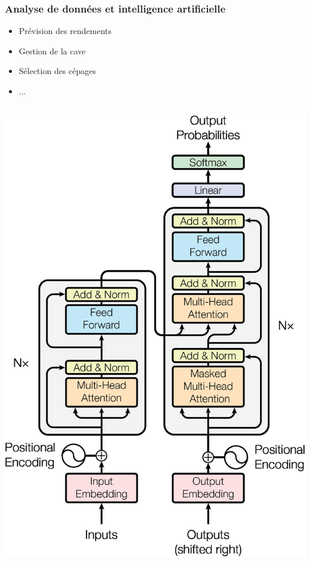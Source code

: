 \documentclass{beamer}
\begin{document}
\begin{frame}
		\frametitle{Analyse de données et intelligence artificielle}
		\begin{itemize}
			\item Prévision des rendements
			\item Gestion de la cave
			\item Sélection des cépages
			\item ...
		\end{itemize}
	
	\begin{columns}[c]
	\centering
	\includegraphics[width=\textwidth]{transformer}
	\centering

\end{columns}
\end{frame}
\end{document}
